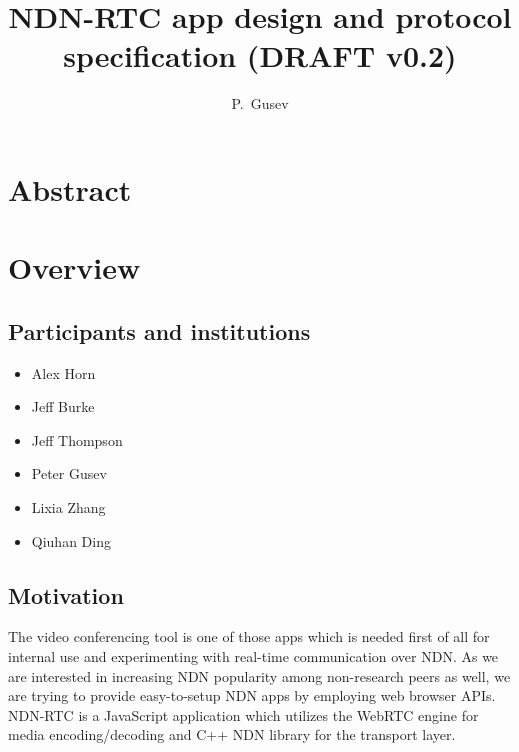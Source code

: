 \documentclass[12pt]{article}
\author{P.~Gusev}
\title{NDN-RTC app design and protocol specification (DRAFT v0.2)}
\begin{document}
\maketitle
\newpage

\section*{Abstract}
\tableofcontents

\newpage
\section{Overview}
\subsection{Participants and institutions}
\begin{multicols}{3}
\begin{itemize}
\item Alex Horn
\item Jeff Burke
\item Jeff Thompson
\item Peter Gusev
\item Lixia Zhang
\item Qiuhan Ding
\end{itemize}
\end{multicols}

\subsection{Motivation}
The video conferencing tool is one of those apps which is needed first of all for internal use and experimenting with real-time communication over NDN. As we are interested in increasing NDN popularity among non-research peers as well, we are trying to provide easy-to-setup NDN apps by employing web browser APIs. NDN-RTC is a JavaScript application which utilizes the WebRTC engine for media encoding/decoding and C++ NDN library for the transport layer.
\end{document}
